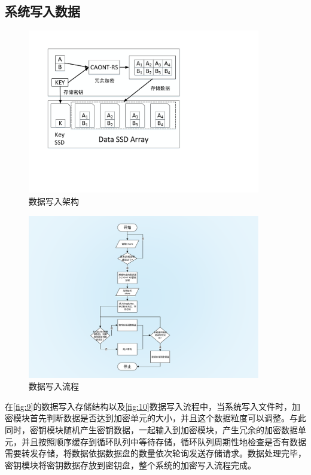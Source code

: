 \subsection{系统写入数据}
\begin{figure}[H]
	\centering
	\includegraphics[width=4in]{Pics/data-write-st.pdf}
	\caption{数据写入架构}\label{fig:9}
\end{figure}
\begin{figure}[H]
	\centering
	\includegraphics[width=4in]{Pics/data-write-pr.pdf}
	\caption{数据写入流程}\label{fig:10}
\end{figure}
在\autoref{fig:9}的数据写入存储结构以及\autoref{fig:10}数据写入流程中，当系统写入文件时，加密模块首先判断数据是否达到加密单元的大小，并且这个数据粒度可以调整。与此同时，密钥模块随机产生密钥数据，一起输入到加密模块，产生冗余的加密数据单元，并且按照顺序缓存到循环队列中等待存储，循环队列周期性地检查是否有数据需要转发存储，将数据依据数据盘的数量依次轮询发送存储请求。数据处理完毕，密钥模块将密钥数据存放到密钥盘，整个系统的加密写入流程完成。
